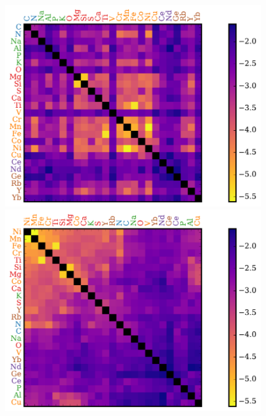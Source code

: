 \documentclass[a4paper,fleqn,usenatbib]{mnras}
\begin{document}
\begin{figure}
	\includegraphics[width=\columnwidth]{apogee_centers_final_29502_spc_win_wid_1p5_sorted_inf_gains_fam_z.pdf}
	\includegraphics[width=\columnwidth]{apogee_centers_final_29502_spc_win_wid_1p5_sorted_inf_gains_abs_min_tot_dist.pdf}

\end{figure}
\end{document}
